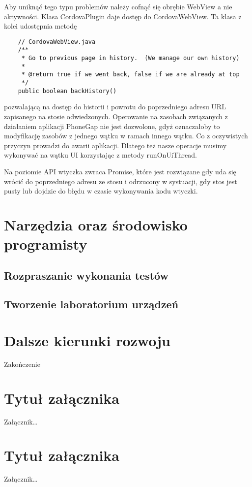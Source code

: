 \documentclass[brudnopis]{xmgr}
\begin{document}
Aby uniknąć tego typu problemów należy cofnąć się obrębie WebView a nie aktywności. Klasa CordovaPlugin daje dostęp do CordovaWebView. Ta klasa z kolei udostępnia metodę 

\begin{lstlisting}
    // CordovaWebView.java
    /**
     * Go to previous page in history.  (We manage our own history)
     *
     * @return true if we went back, false if we are already at top
     */
    public boolean backHistory()
\end{lstlisting}

pozwalającą na dostęp do historii i powrotu do poprzedniego  adresu URL zapisanego na stosie odwiedzonych. Operowanie na zasobach związanych z działaniem aplikacji PhoneGap nie jest dozwolone, gdyż oznaczałoby to modyfikację zasobów z jednego wątku w ramach innego wątku. Co z oczywistych przyczyn prowadzi do awarii aplikacji. Dlatego też nasze operacje musimy wykonywać na wątku UI korzystając z metody runOnUiThread.

Na poziomie API wtyczka zwraca Promise, które jest rozwiązane gdy uda się wrócić do poprzedniego adresu ze stosu i odrzucony w systuacji, gdy stos jest pusty lub dojdzie do błędu w czasie wykonywania kodu wtyczki.

\chapter{Narzędzia oraz środowisko programisty}

\section{Rozpraszanie wykonania testów}

\section{Tworzenie laboratorium urządzeń}

\chapter{Dalsze kierunki rozwoju}

\summary

Zakończenie

\appendix
\chapter{Tytuł załącznika}

Załącznik…

\chapter{Tytuł załącznika}

Załącznik…






\oswiadczenie
\end{document}

